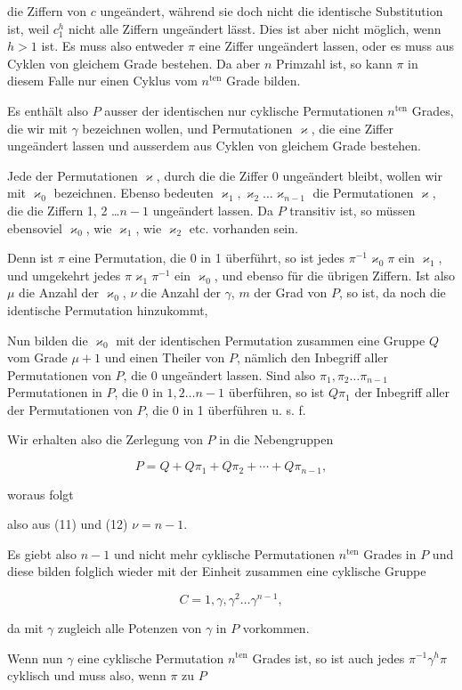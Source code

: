 die Ziffern von $c$ ungeändert, während sie doch nicht die identische Substitution ist, weil $c_1^h$ nicht alle Ziffern ungeändert lässt. Dies ist aber nicht möglich, wenn $h>1$ ist. Es muss also entweder $\pi$ eine Ziffer ungeändert lassen, oder es muss aus Cyklen von gleichem Grade bestehen. Da aber $n$ Primzahl ist, so kann $\pi$ in diesem Falle nur einen Cyklus vom $n^{\mathrm{ten}}$ Grade bilden.

Es enthält also $P$ ausser der identischen nur cyklische Permutationen $n^{\mathrm{ten}}$ Grades, die wir mit $\gamma$ bezeichnen wollen, und Permutationen $\varkappa$, die eine Ziffer ungeändert lassen und ausserdem aus Cyklen von gleichem Grade bestehen.

Jede der Permutationen $\varkappa$, durch die die Ziffer 0 ungeändert bleibt, wollen wir mit $\varkappa_0$ bezeichnen. Ebenso bedeuten $\varkappa_1, \varkappa_2 \ldots \varkappa_{n-1}$ die Permutationen $\varkappa$, die die Ziffern 1, 2 \ldots $n-1$ ungeändert lassen. Da $P$ transitiv ist, so müssen ebensoviel $\varkappa_0$, wie $\varkappa_1$, wie $\varkappa_2$ etc. vorhanden sein.

Denn ist $\pi$ eine Permutation, die 0 in 1 überführt, so ist jedes $\pi^{-1}\varkappa_0\pi$ ein $\varkappa_1$, und umgekehrt jedes $\pi\varkappa_1\pi^{-1}$ ein $\varkappa_0$, und ebenso für die übrigen Ziffern. Ist also $\mu$ die Anzahl der $\varkappa_0$, $\nu$ die Anzahl der $\gamma$, $m$ der Grad von $P$, so ist, da noch die identische Permutation hinzukommt,


Nun bilden die $\varkappa_0$ mit der identischen Permutation zusammen eine Gruppe $Q$ vom Grade $\mu+1$ und einen Theiler von $P$, nämlich den Inbegriff aller Permutationen von $P$, die 0 ungeändert lassen. Sind also $\pi_1, \pi_2 \ldots \pi_{n-1}$ Permutationen in $P$, die 0 in $1, 2 \ldots n-1$ überführen, so ist $Q\pi_1$ der Inbegriff aller der Permutationen von $P$, die 0 in 1 überführen u. s. f.

Wir erhalten also die Zerlegung von $P$ in die Nebengruppen

\[
P = Q + Q\pi_1 + Q\pi_2 + \cdots + Q\pi_{n-1},
\]

woraus folgt


also aus (11) und (12) $\nu = n-1$.

Es giebt also $n-1$ und nicht mehr cyklische Permutationen $n^{\mathrm{ten}}$ Grades in $P$ und diese bilden folglich wieder mit der Einheit zusammen eine cyklische Gruppe

\[
C = 1, \gamma, \gamma^2 \ldots \gamma^{n-1},
\]

da mit $\gamma$ zugleich alle Potenzen von $\gamma$ in $P$ vorkommen.

Wenn nun $\gamma$ eine cyklische Permutation $n^{\mathrm{ten}}$ Grades ist, so ist auch jedes $\pi^{-1}\gamma^h\pi$ cyklisch und muss also, wenn $\pi$ zu $P$
